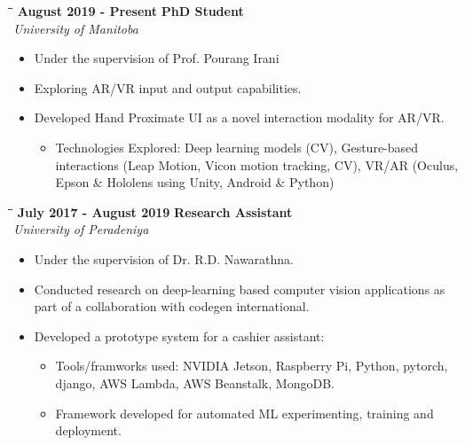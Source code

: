 \documentclass[a4paper,10pt]{article}
\begin{document}
{\begin{minipage}[t]{0.60\textwidth}
    \begin{tabbing}
      \=\hspace*{6cm}\=\hspace*{5cm}\= \kill
      \>\textbf{ August 2019 - Present} \> \textbf{PhD Student}\\\>\> \emph{University of Manitoba}
    \end{tabbing}
    \vspace{-0.4cm}
    \begin{itemize}
      \setlength\itemsep{-0.1pt}
      \small
    \item Under the supervision of Prof. Pourang Irani
    \item Exploring AR/VR input and output capabilities.
    \item Developed Hand Proximate UI as a novel interaction modality for AR/VR.
      \vspace{-5pt}
      \begin{itemize}
      \item Technologies Explored: Deep learning models (CV), Gesture-based interactions (Leap Motion, Vicon motion tracking, CV), VR/AR (Oculus, Epson \& Hololens using Unity, Android \& Python)
      \end{itemize}
    \end{itemize}
    \begin{tabbing}
      \=\hspace*{6cm}\=\hspace*{5cm}\= \kill
      \>\textbf{ July 2017 - August 2019} \> \textbf{Research Assistant}\\\>\> \emph{University of Peradeniya}
    \end{tabbing}
    \vspace{-0.5cm}
    \begin{itemize}
      \setlength\itemsep{-0.1pt}
      \small
    \item Under the supervision of Dr. R.D. Nawarathna.
    \item Conducted research on deep-learning based computer vision applications as part of a collaboration with codegen international.
    \item Developed a prototype system for a cashier assistant:
      \vspace{-5pt}
      \begin{itemize}
        \setlength\itemsep{-0.1pt}
      \item Tools/framworks used: NVIDIA Jetson, Raspberry Pi, Python, pytorch, django, AWS Lambda, AWS Beanstalk, MongoDB.
      \item Framework developed for automated ML experimenting, training and deployment.

\end{itemize}
\end{itemize}
\end{minipage}}
\end{document}
